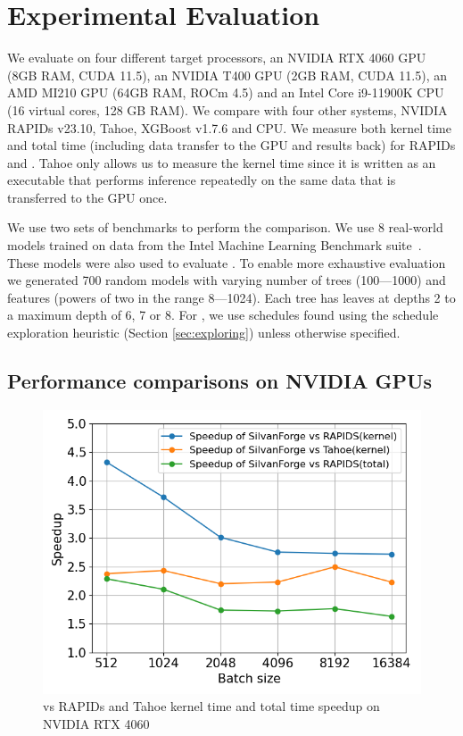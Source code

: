 \section{Experimental Evaluation}
\label{sec:results}

We evaluate \Treebeard{} on four different target processors, an NVIDIA RTX 4060 GPU (8GB RAM, CUDA 11.5),
an NVIDIA T400 GPU (2GB RAM, CUDA 11.5), an AMD MI210 GPU (64GB RAM, ROCm 4.5) and an 
Intel Core i9-11900K CPU (16 virtual cores, 128 GB RAM). We compare \Treebeard{} with 
four other systems, NVIDIA RAPIDs v23.10, Tahoe, XGBoost v1.7.6 and \TreebeardOLD{} CPU. 
We measure both kernel time and total time (including data transfer to the GPU and results back) 
for RAPIDs and \Treebeard{}. Tahoe only allows us to measure the kernel time since it is written
as an executable that performs inference repeatedly on the same data that is transferred to the GPU once.

We use two sets of benchmarks to perform the comparison.
We use 8 real-world models trained on data from the Intel Machine 
Learning Benchmark suite~\cite{MLBenchmarks}. These models were also
used to evaluate \TreebeardOLD{}\cite{Treebeard}.
To enable more exhaustive evaluation we generated 700 random models with
varying number of trees (100---1000) and features (powers of two in the range 8---1024). 
Each tree has leaves at depths 2 to a maximum depth of 6, 7 or 8.
For \Treebeard{}, we use schedules found using the schedule exploration
heuristic (Section \ref{sec:exploring}) unless otherwise specified.

\subsection{Performance comparisons on NVIDIA GPUs}

\begin{figure}[htb]
  \centering
  \includegraphics[width=0.75\linewidth]{figures/geomean_speedup_4060_kernel_time_total_time.png}
  \caption{\Treebeard{} vs RAPIDs and Tahoe kernel time and total time speedup on NVIDIA RTX 4060}
  \label{Fig:TBvsRAPIDsTahoe_4060_Speedup}
\end{figure}

